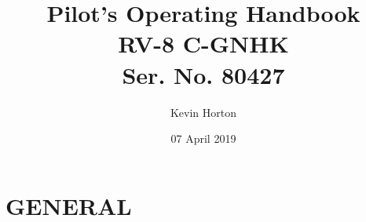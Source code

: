 \title{Pilot's Operating Handbook\\
[1in]RV-8 C-GNHK\\
[0.25in]Ser. No. 80427}

\author{Kevin Horton}


\date{07 April 2019}


\maketitle \clearpage

\cleardoublepage \setcounter{tocdepth}{0} 

\tableofcontents{}

\clearpage

\mainmatter

\chapter{GENERAL} \vspace{\minitocspacebefore} \minitoc \clearpage


